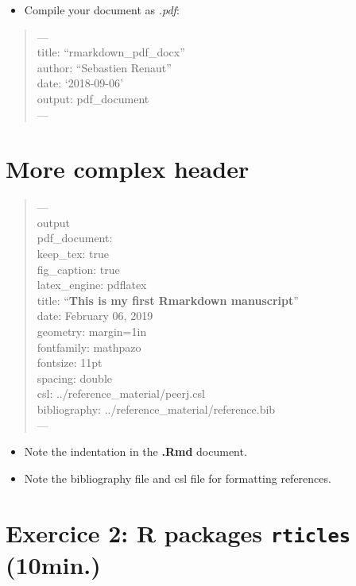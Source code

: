 \documentclass[]{article}
\providecommand{\tightlist}{%
  \setlength{\itemsep}{0pt}\setlength{\parskip}{0pt}}
\begin{document}
\begin{itemize}
\tightlist
\item
  Compile your document as \emph{.pdf}:
\end{itemize}

\begin{quote}
---\\
title: ``rmarkdown\_pdf\_docx''\\
author: ``Sebastien Renaut''\\
date: `2018-09-06'\\
output: pdf\_document\\
---
\end{quote}

\section{More complex header}\label{more-complex-header}

\begin{quote}
---\\
output\\
pdf\_document:\\
keep\_tex: true\\
fig\_caption: true\\
latex\_engine: pdflatex\\
title: ``\textbf{This is my first Rmarkdown manuscript}''\\
date: February 06, 2019\\
geometry: margin=1in\\
fontfamily: mathpazo\\
fontsize: 11pt\\
spacing: double\\
csl: ../reference\_material/peerj.csl\\
bibliography: ../reference\_material/reference.bib\\
---
\end{quote}

\begin{itemize}
\item
  Note the indentation in the \textbf{.Rmd} document.
\item
  Note the bibliography file and csl file for formatting references.
\end{itemize}

\section{\texorpdfstring{Exercice 2: R packages \texttt{rticles}
(10min.)}{Exercice 2: R packages rticles (10min.)}}\label{exercice-2-r-packages-rticles-10min.}
\end{document}
